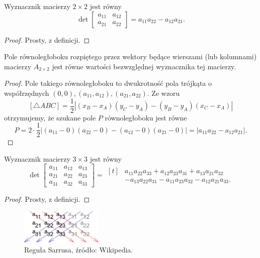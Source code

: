 \begin{theorem}
    Wyznacznik macierzy $2 \times 2$ jest równy
    \[ \det\begin{bmatrix}
        a_{11} & a_{12} \\
        a_{21} & a_{22}
    \end{bmatrix} = a_{11}a_{22} - a_{12}a_{21}. \]
\end{theorem}
\begin{proof}
    Prosty, z definicji.
\end{proof}

\begin{fact}
    Pole równoległoboku rozpiętego przez wektory będące wierszami (lub kolumnami) macierzy $A_{2\times 2}$ jest równe wartości bezwzględnej wyznacznika tej macierzy.
\end{fact}

\begin{proof}
    Pole takiego równoległoboku to dwukrotność pola trójkąta o współrzędnych $(0, 0), (a_{11}, a_{12}), (a_{21}, a_{22})$. Ze wzoru
    \[ [\triangle ABC] = \frac{1}{2}\left|(x_B - x_A)(y_C - y_A) - (y_B - y_A)(x_C - x_A)\right| \]
    otrzymujemy, że szukane pole $P$ równoległoboku jest równe
    \[ P = 2\cdot\frac{1}{2}\left|(a_{11} - 0)(a_{22} - 0) - (a_{12} - 0)(a_{21} - 0)\right| = |a_{11}a_{22} - a_{12}a_{21}|. \]
\end{proof}

\begin{theorem}
    Wyznacznik macierzy $3 \times 3$ jest równy
    \[ \det\begin{bmatrix}
        a_{11} & a_{12} & a_{13} \\
        a_{21} & a_{22} & a_{23} \\
        a_{31} & a_{32} & a_{33}
    \end{bmatrix} = \begin{aligned}[t] &a_{11}a_{22}a_{33} + a_{12}a_{23}a_{31} + a_{13}a_{21}a_{32} \\
                                       &- a_{13}a_{22}a_{31} - a_{11}a_{23}a_{32} - a_{12}a_{21}a_{33}.\end{aligned} \]
\end{theorem}
\begin{proof}
    Prosty, z definicji.
\end{proof}

\begin{figure}[h]
    \centering
    \includegraphics[width=0.35\textwidth]{Sarrus_rule.pdf}
    \caption{Reguła Sarrusa, źródło: Wikipedia.}
\end{figure}

